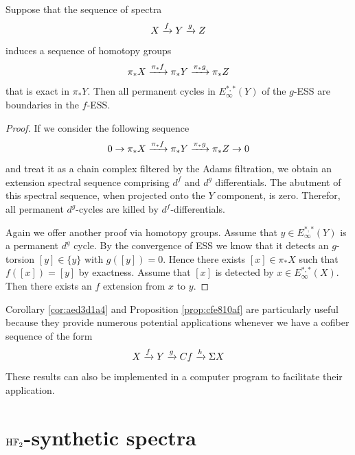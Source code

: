 \documentclass{amsart}
\numberwithin{equation}{section}
\newcommand{\HF}{\mathrm{H}\bF_2}
\begin{document}
\begin{proposition}\label{prop:cfe810af}
    Suppose that the sequence of spectra
    $$X\xrightarrow{f}Y\xrightarrow{g}Z$$
    induces a sequence of homotopy groups
    $$\pi_*X\xrightarrow{\pi_*f}\pi_*Y\xrightarrow{\pi_*g}\pi_*Z$$
    that is exact in $\pi_*Y$. Then all permanent cycles in $E^{*,*}_\infty(Y)$ of the $g$-ESS are boundaries in the $f$-ESS.
\end{proposition}

\begin{proof}
    If we consider the following sequence
    \begin{equation}\label{eq:8c7eec14}
        0\to \pi_*X\xrightarrow{\pi_*f}\pi_*Y\xrightarrow{\pi_*g}\pi_*Z\to 0
    \end{equation}
    and treat it as a chain complex filtered by the Adams filtration, we obtain an extension spectral sequence comprising $d^f$ and $d^g$ differentials. The abutment of this spectral sequence, when projected onto the $Y$ component, is zero. Therefor, all permanent $d^g$-cycles are killed by $d^f$-differentials.

    Again we offer another proof via homotopy groups. Assume that $y\in E^{*,*}_\infty(Y)$ is a permanent $d^g$ cycle. By the convergence of ESS we know that it detects an $g$-torsion $[y]\in \{y\}$ with $g([y])=0$. Hence there exists $[x]\in \pi_*X$ such that $f([x])=[y]$ by exactness. Assume that $[x]$ is detected by $x\in E^{*,*}_\infty(X)$. Then there exists an $f$ extension from $x$ to $y$.
\end{proof}

Corollary \ref{cor:aed3d1a4} and Proposition \ref{prop:cfe810af} are particularly useful because they provide numerous potential applications whenever we have a cofiber sequence of the form
$$X\xrightarrow{f}Y\xrightarrow{g}Cf\xrightarrow{h}\Sigma X$$
These results can also be implemented in a computer program to facilitate their application.

\section{$\HF$-synthetic spectra} \label{sec:synthetic}
\end{document}
